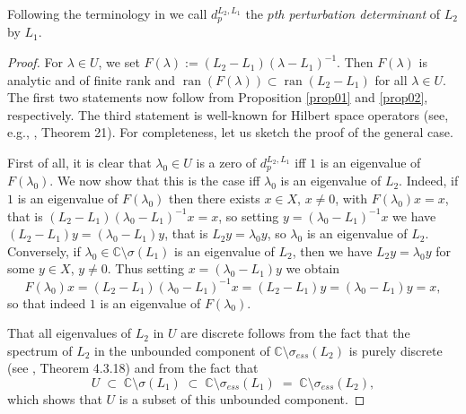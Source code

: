 \documentclass[12pt,a4paper]{article}
\theoremstyle{definition}
\theoremstyle{remark}
\numberwithin{equation}{section}
\newcommand{\mc}{{\mathbb C}}
\newcommand{\ran}{\operatorname{ran}}
\begin{document}
Following the terminology in \cite{gohberg2} we call $d_{p}^{L_2,L_1}$ the \emph{$p$th perturbation determinant} of $L_2$ by $L_1$.
\begin{proof}
 For $\lambda \in U$, we set $F(\lambda):=(L_2-L_1)(\lambda-L_1)^{-1}$. Then $F(\lambda)$ is analytic and of finite rank and $\ran(F(\lambda)) \subset \ran(L_2-L_1)$ for all $\lambda \in U$. The first two statements now follow from Proposition \ref{prop01} and \ref{prop02}, respectively. The third statement is well-known for Hilbert space operators (see, e.g., \cite{MR2662459}, Theorem 21). For completeness, let us sketch the proof of the general case.
 
  First of all, it is clear that $\lambda_0 \in U$ is a zero of $d_{p}^{L_2,L_1}$ iff $1$ is an eigenvalue of $F(\lambda_0)$. We now show that this is the case iff $\lambda_0$ is an eigenvalue of $L_2$. Indeed, if $1$ is an eigenvalue of $F(\lambda_0)$ then there exists
 $x\in X$, $x\neq 0$, with $F(\lambda_0)x=x$, that is $(L_2-L_1)(\lambda_0-L_1)^{-1}x=x$, so setting $y=(\lambda_0-L_1)^{-1}x$ we have
 $(L_2-L_1)y=(\lambda_0-L_1)y$, that is $L_2y=\lambda_0 y$, so $\lambda_0$ is an eigenvalue of $L_2$. Conversely, if $\lambda_0\in \mc\setminus \sigma(L_1)$ is an eigenvalue of $L_2$, then we have  $L_2y=\lambda_0 y$ for some $y\in X$, $y\neq 0$.  Thus setting $x=(\lambda_0-L_1)y$ we obtain
 $$F(\lambda_0)x=(L_2-L_1)(\lambda_0-L_1)^{-1}x=(L_2-L_1)y=(\lambda_0-L_1)y=x,$$
 so that indeed $1$ is an eigenvalue of $F(\lambda_0)$.
 
That all eigenvalues of $L_2$ in $U$ are discrete follows from the fact that the spectrum of $L_2$ in the unbounded component of $\mc \setminus \sigma_{ess}(L_2)$ is purely discrete  (see \cite{b_Davies}, Theorem 4.3.18) and from the fact that 
$$U \; \subset \; \mc \setminus \sigma(L_1) \; \subset \; \mc \setminus \sigma_{ess}(L_1) \;=\; \mc \setminus \sigma_{ess}(L_2),$$
which shows that $U$ is a subset of this unbounded component.


\end{proof}
\end{document}
